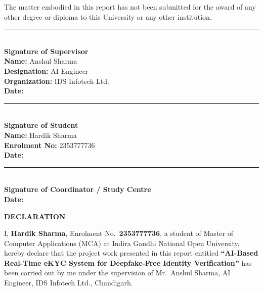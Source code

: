 \documentclass[12pt,a4paper]{report}
\begin{document}
The matter embodied in this report has not been submitted for the award of any other degree or diploma to this University or any other institution.

\vspace{2cm}

\begin{minipage}[t]{0.45\textwidth}
    \rule{6cm}{0.5pt}\\
    \textbf{Signature of Supervisor}\\[0.4cm]
    \textbf{Name:} Anshul Sharma\\
    \textbf{Designation:} AI Engineer\\
    \textbf{Organization:} IDS Infotech Ltd.\\
    \textbf{Date:} \underline{\hspace{3cm}}
\end{minipage}
\hfill
\begin{minipage}[t]{0.45\textwidth}
    \rule{6cm}{0.5pt}\\
    \textbf{Signature of Student}\\[0.4cm]
    \textbf{Name:} Hardik Sharma\\
    \textbf{Enrolment No:} 2353777736\\
    \textbf{Date:} \underline{\hspace{3cm}}
\end{minipage}

\vspace{2cm}
\begin{center}
    \rule{6cm}{0.5pt}\\
    \textbf{Signature of Coordinator / Study Centre}\\[0.3cm]
    \textbf{Date:} \underline{\hspace{3cm}}
\end{center}

\newpage
\thispagestyle{empty}
\begin{center}
    {\Large \textbf{DECLARATION}}
\end{center}
\vspace{1cm}

I, \textbf{Hardik Sharma}, Enrolment No.~\textbf{2353777736}, a student of Master of Computer Applications (MCA) at Indira Gandhi National Open University, hereby declare that the project work presented in this report entitled \textbf{``AI-Based Real-Time eKYC System for Deepfake-Free Identity Verification''} has been carried out by me under the supervision of Mr.~Anshul Sharma, AI Engineer, IDS Infotech Ltd., Chandigarh.
\end{document}
